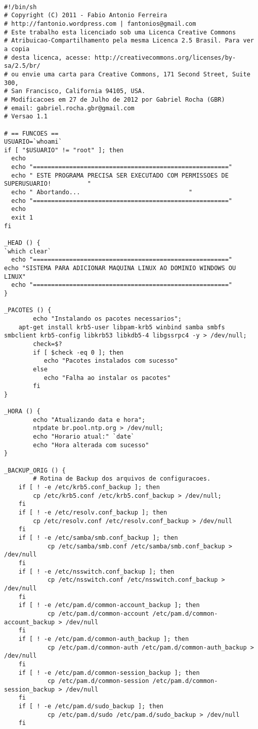 \begin{lstlisting}

#!/bin/sh 
# Copyright (C) 2011 - Fabio Antonio Ferreira
# http://fantonio.wordpress.com | fantonios@gmail.com
# Este trabalho esta licenciado sob uma Licenca Creative Commons
# Atribuicao-Compartilhamento pela mesma Licenca 2.5 Brasil. Para ver a copia
# desta licenca, acesse: http://creativecommons.org/licenses/by-sa/2.5/br/
# ou envie uma carta para Creative Commons, 171 Second Street, Suite 300,
# San Francisco, California 94105, USA.
# Modificacoes em 27 de Julho de 2012 por Gabriel Rocha (GBR)
# email: gabriel.rocha.gbr@gmail.com
# Versao 1.1
 
# == FUNCOES ==
USUARIO=`whoami`
if [ "$USUARIO" != "root" ]; then
  echo
  echo "======================================================"
  echo " ESTE PROGRAMA PRECISA SER EXECUTADO COM PERMISSOES DE SUPERUSUARIO!          "  
  echo " Abortando...                              "
  echo "======================================================"
  echo
  exit 1
fi
 
_HEAD () {
`which clear`
  echo "======================================================"
echo "SISTEMA PARA ADICIONAR MAQUINA LINUX AO DOMINIO WINDOWS OU LINUX"
  echo "======================================================"
}
 
_PACOTES () {
        echo "Instalando os pacotes necessarios";       
	apt-get install krb5-user libpam-krb5 winbind samba smbfs smbclient krb5-config libkrb53 libkdb5-4 libgssrpc4 -y > /dev/null;
        check=$?
        if [ $check -eq 0 ]; then
           echo "Pacotes instalados com sucesso"
        else
           echo "Falha ao instalar os pacotes"
        fi
}
 
_HORA () {
        echo "Atualizando data e hora";
        ntpdate br.pool.ntp.org > /dev/null;
        echo "Horario atual:" `date`
        echo "Hora alterada com sucesso"
}
 
_BACKUP_ORIG () {
        # Rotina de Backup dos arquivos de configuracoes.
	if [ ! -e /etc/krb5.conf_backup ]; then
		cp /etc/krb5.conf /etc/krb5.conf_backup > /dev/null;
	fi
	if [ ! -e /etc/resolv.conf_backup ]; then
		cp /etc/resolv.conf /etc/resolv.conf_backup > /dev/null
	fi
	if [ ! -e /etc/samba/smb.conf_backup ]; then
        	cp /etc/samba/smb.conf /etc/samba/smb.conf_backup > /dev/null
	fi
	if [ ! -e /etc/nsswitch.conf_backup ]; then
        	cp /etc/nsswitch.conf /etc/nsswitch.conf_backup > /dev/null
	fi
	if [ ! -e /etc/pam.d/common-account_backup ]; then
	        cp /etc/pam.d/common-account /etc/pam.d/common-account_backup > /dev/null
	fi
	if [ ! -e /etc/pam.d/common-auth_backup ]; then
	        cp /etc/pam.d/common-auth /etc/pam.d/common-auth_backup > /dev/null
	fi
	if [ ! -e /etc/pam.d/common-session_backup ]; then
	        cp /etc/pam.d/common-session /etc/pam.d/common-session_backup > /dev/null
	fi
	if [ ! -e /etc/pam.d/sudo_backup ]; then
	        cp /etc/pam.d/sudo /etc/pam.d/sudo_backup > /dev/null
	fi
         

\end{lstlisting}
